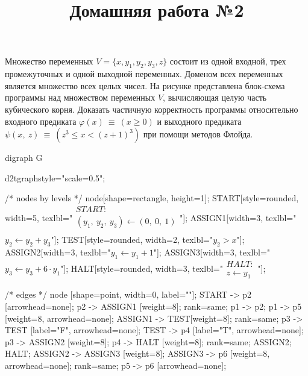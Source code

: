 \documentclass[12pt, a4paper]{article}
\title{Домашняя работа №2}
\date{}
\author{}
\begin{document}
\maketitle

Множество переменных $V = \{ x, y_1, y_2, y_3, z \}$ состоит из одной входной, трех промежуточных и одной выходной переменных. Доменом всех переменных является множество всех целых чисел. На рисунке представлена блок-схема программы над множеством переменных $V$, вычисляющая целую часть кубического корня. Доказать частичную корректность программы относительно входного предиката $\varphi(x)~\equiv~(x \geq 0)$ и выходного предиката $\psi(x,~z)~\equiv~( z^3 \leq x < (z + 1)^3 )$ при помощи методов Флойда.

\hspace{2cm}

\begin{dot2tex}[options=-traw]
	digraph G{
		d2tgraphstyle="scale=0.5";

		/* nodes by levels */
		node[shape=rectangle, height=1];
		START[style=rounded, width=5, texlbl="$\begin{matrix}START:\\ (y_1,~y_2,~y_3) \leftarrow (0,~0,~1)\\\end{matrix}$"];
		ASSIGN1[width=3, texlbl="$y_2 \leftarrow y_2 + y_3$"];
        TEST[style=rounded, width=2, texlbl="$y_2 > x$"];
		ASSIGN2[width=3, texlbl="$y_1 \leftarrow y_1 + 1$"];
		ASSIGN3[width=3, texlbl="$y_3 \leftarrow y_3 + 6 \cdot y_1$"];
		HALT[style=rounded, width=3, texlbl="$\begin{matrix}HALT:\\ z \leftarrow y_1\end{matrix}$"];

        /* edges */
		node [shape=point, width=0, label=""];
		START -> p2 [arrowhead=none]; p2 -> ASSIGN1 [weight=8];
		{ rank=same; p1 -> p2; }
		p1 -> p5 [weight=8, arrowhead=none];
        ASSIGN1 -> TEST[weight=8];
		{ rank=same; p3 -> TEST [label="F", arrowhead=none]; TEST -> p4 [label="T", arrowhead=none]; }
		p3 -> ASSIGN2 [weight=8];
		p4 -> HALT [weight=8];
		{ rank=same; ASSIGN2; HALT; }
        ASSIGN2 -> ASSIGN3 [weight=8];
		ASSIGN3 -> p6 [weight=8, arrowhead=none];
		{ rank=same; p5 -> p6 [arrowhead=none]; }
	}
\end{dot2tex}
\end{document}
